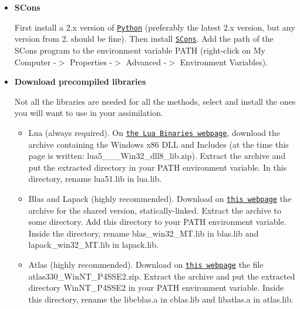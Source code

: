 \documentclass{tufte-book}
\begin{document}
\begin{itemize}
\item {\bfseries \-S\-Cons} \par
 \-First install a 2.\-x version of \href{http://www.python.org/download/}{\tt \-Python} (preferably the latest 2.\-x version, but any version from 2. should be fine). \-Then install \href{http://www.scons.org/}{\tt \-S\-Cons}. \-Add the path of the \-S\-Cons program to the environment variable {\ttfamily \-P\-A\-T\-H} (right-\/click on \-My \-Computer -\/$>$ \-Properties -\/$>$ \-Advanced -\/$>$ \-Environment \-Variables).


\item {\bfseries \-Download precompiled libraries} \par


\-Not all the libraries are needed for all the methods, select and install the ones you will want to use in your assimilation.


\begin{itemize}
\item \-Lua (always required). \-On \href{http://luabinaries.sourceforge.net/download.html}{\tt the \-Lua \-Binaries webpage}, download the archive containing the \-Windows x86 \-D\-L\-L and \-Includes (at the time this page is written\-: {\ttfamily lua5\-\_\-\_\-\_\-\-Win32\-\_\-dll8\-\_\-lib.\-zip}). \-Extract the archive and put the extracted directory in your \-P\-A\-T\-H environment variable. \-In this directory, rename {\ttfamily lua51.\-lib} in {\ttfamily lua.\-lib}.
\end{itemize}


\begin{itemize}
\item \-Blas and \-Lapack (highly recommended). \-Download on \href{http://www.fi.muni.cz/~xsvobod2/misc/lapack/}{\tt this webpage} the archive for the shared version, statically-\/linked. \-Extract the archive to some directory. \-Add this directory to your {\ttfamily \-P\-A\-T\-H} environment variable. \-Inside the directory, rename {\ttfamily blas\-\_\-win32\-\_\-\-M\-T.\-lib} in {\ttfamily blas.\-lib} and {\ttfamily lapack\-\_\-win32\-\_\-\-M\-T.\-lib} in {\ttfamily lapack.\-lib}. \par

\end{itemize}


\begin{itemize}
\item \-Atlas (highly recommended). \-Download on \href{http://www.netlib.org/atlas/archives/windows/}{\tt this webpage} the file {\ttfamily atlas330\-\_\-\-Win\-N\-T\-\_\-\-P4\-S\-S\-E2.\-zip}. \-Extract the archive and put the extracted directory {\ttfamily \-Win\-N\-T\-\_\-\-P4\-S\-S\-E2} in your {\ttfamily \-P\-A\-T\-H} environment variable. \-Inside this directory, rename the {\ttfamily libcblas.\-a} in {\ttfamily cblas.\-lib} and {\ttfamily libatlas.\-a} in {\ttfamily atlas.\-lib}. \par


\end{itemize}
\end{itemize}
\end{document}
